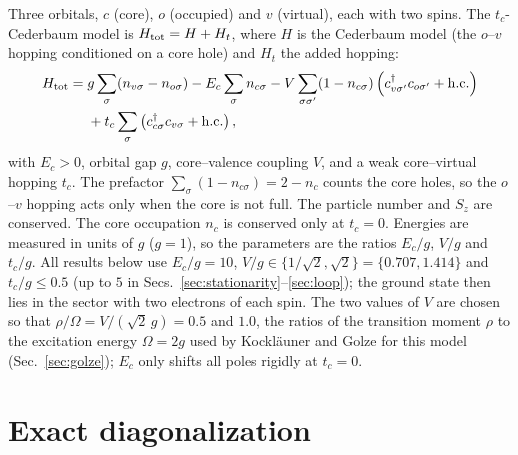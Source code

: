\documentclass[11pt]{article}
\newcommand{\dg}{^{\dagger}}
\begin{document}
Three orbitals, $c$ (core), $o$ (occupied) and $v$ (virtual), each with two spins. The $t_c$-Cederbaum model is
$H_{\rm tot}=H+H_t$, where $H$ is the Cederbaum model (the $o$--$v$ hopping conditioned on a core hole) and $H_t$ the added hopping:
\begin{equation}
\begin{aligned}
H_{\rm tot}={}&g\sum_\sigma(n_{v\sigma}-n_{o\sigma})-E_c\sum_\sigma n_{c\sigma}
-V\sum_{\sigma\sigma'}(1-n_{c\sigma})\left(c\dg_{v\sigma'}c_{o\sigma'}+\mathrm{h.c.}\right)\\
&+t_c\sum_\sigma\left(c\dg_{c\sigma}c_{v\sigma}+\mathrm{h.c.}\right),
\end{aligned}
\label{eq:Htot}
\end{equation}
with $E_c>0$, orbital gap $g$, core--valence coupling $V$, and a weak core--virtual hopping $t_c$. The prefactor
$\sum_\sigma(1-n_{c\sigma})=2-n_c$ counts the core holes, so the $o$--$v$ hopping acts only when the core is not full.
The particle number and $S_z$ are conserved. The core occupation $n_c$ is conserved only at $t_c=0$. Energies are measured in units of $g$ ($g=1$), so the parameters are the ratios $E_c/g$, $V/g$ and $t_c/g$. All results
below use $E_c/g=10$, $V/g\in\{1/\sqrt2,\sqrt2\}=\{0.707,1.414\}$ and $t_c/g\le0.5$ (up to $5$ in Secs.~\ref{sec:stationarity}--\ref{sec:loop}); the ground state then lies in the sector with two electrons of each
spin. The two values of $V$ are chosen so that $\rho/\Omega=V/(\sqrt2\,g)=0.5$ and $1.0$, the ratios of the transition moment $\rho$ to the excitation
energy $\Omega=2g$ used by Kockl\"auner and Golze for this model~\cite{Kocklauner2024} (Sec.~\ref{sec:golze}); $E_c$ only shifts all poles rigidly at $t_c=0$.

\section{Exact diagonalization}
\label{sec:ED}
\end{document}
